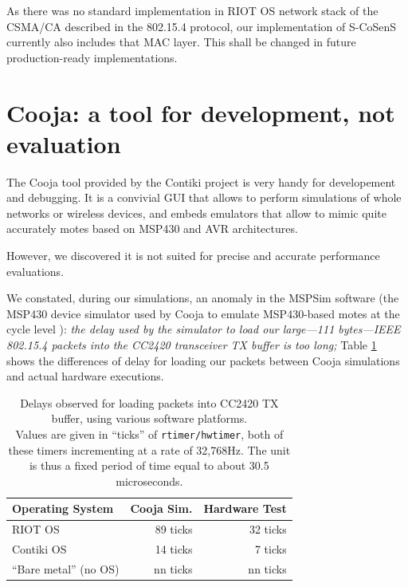 \documentclass[conference]{IEEEtran}
\begin{document}
As there was no standard implementation in RIOT OS network stack of
the CSMA/CA described in the 802.15.4 protocol, our implementation of
S-CoSenS currently also includes that MAC layer. This shall be changed
in future production-ready implementations.



\section{Cooja: a tool for development, not evaluation}
\label{SectCoojaDevNotEval}

The Cooja tool provided by the Contiki project \cite{Cooja} is very handy for
developement and debugging. It is a convivial GUI that allows to perform
simulations of whole networks or wireless devices, and embeds emulators
that allow to mimic quite accurately motes based on MSP430 and AVR
architectures.

However, we discovered it is not suited for precise and accurate
performance evaluations.

We constated, during our simulations, an anomaly in the MSPSim software
(the MSP430 device simulator used by Cooja to emulate MSP430-based motes
at the cycle level \cite{MSPSim}): \emph{the delay used by the simulator
to load our large---111 bytes---IEEE 802.15.4 packets into the CC2420
transceiver TX buffer is too long;} Table \ref{TblTXPktLoadDelays} shows
the differences of delay for loading our packets between Cooja simulations
and actual hardware executions.

\begin{table}[!h]
\centering
\begin{tabular}{|l|r|r|}
\hline
Operating System       &  Cooja Sim.  & Hardware Test \\
\hline
RIOT OS                &   89 ticks   &  32 ticks \\ 
Contiki OS             &   14 ticks   &   7 ticks \\
``Bare metal'' (no OS) &   nn ticks   &  nn ticks \\
\hline
\end{tabular}
\caption{Delays observed for loading packets into CC2420 TX buffer,
using various software platforms.\\
Values are given in ``ticks'' of \texttt{rtimer/hwtimer}, both of these
timers incrementing at a rate of 32,768Hz. The unit is thus a fixed period
of time equal to about 30.5 microseconds.}
\label{TblTXPktLoadDelays}
\end{table}
\end{document}
